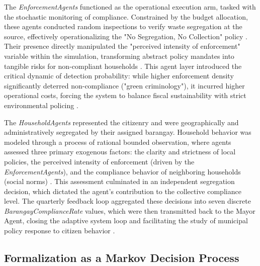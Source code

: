 The \textit{EnforcementAgents} functioned as the operational execution arm, tasked with the stochastic monitoring of compliance. Constrained by the budget allocation, these agents conducted random inspections to verify waste segregation at the source, effectively operationalizing the "No Segregation, No Collection" policy \citep{Badua2022}. Their presence directly manipulated the "perceived intensity of enforcement" variable within the simulation, transforming abstract policy mandates into tangible risks for non-compliant households \citep{Carpio2025}. This agent layer introduced the critical dynamic of detection probability: while higher enforcement density significantly deterred non-compliance ("green criminology"), it incurred higher operational costs, forcing the system to balance fiscal sustainability with strict environmental policing \citep{Chen2023, Ibanez2022}.

The \textit{HouseholdAgents} represented the citizenry and were geographically and administratively segregated by their assigned barangay. Household behavior was modeled through a process of rational bounded observation, where agents assessed three primary exogenous factors: the clarity and strictness of local policies, the perceived intensity of enforcement (driven by the \textit{EnforcementAgents}), and the compliance behavior of neighboring households (social norms) \citep{Meng2018, Liao2024}. This assessment culminated in an independent segregation decision, which dictated the agent's contribution to the collective compliance level. The quarterly feedback loop aggregated these decisions into seven discrete \textit{BarangayComplianceRate} values, which were then transmitted back to the Mayor Agent, closing the adaptive system loop and facilitating the study of municipal policy response to citizen behavior \citep{Ceschi2021, Fontaine2024}.









\subsection{Formalization as a Markov Decision Process}

